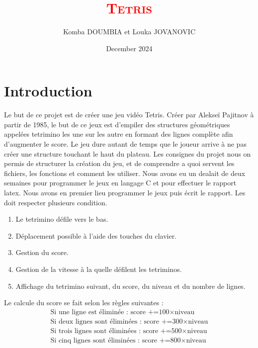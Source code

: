 \documentclass[a4paper,10p]{report}
\begin{document}
\begin{titlepage}
\author{\Large{Komba DOUMBIA et Louka JOVANOVIC}}
\title{\textcolor{red} {\textsc{\Huge Tetris}}}
\date{December 2024}
\maketitle
\end{titlepage}

\tableofcontents

\chapter{Introduction}
Le but de ce projet est de créer une jeu vidéo Tetris. Créer par Alekseï Pajitnov à partir de 1985, le but de ce jeux est d'empiler des structures géométriques appelées tetrimino les une sur les autre en formant des lignes complète afin d'augmenter le score. Le jeu dure autant de temps que le joueur arrive à ne pas créer une structure touchant le haut du plateau. Les consignes du projet nous on permis de structurer la création du jeu, et de comprendre a quoi servent les fichiers, les fonctions et comment les utiliser. Nous avons eu un dealait de deux semaines pour programmer le jeux en langage C et pour effectuer le rapport latex. Nous avons en premier lieu programmer le jeux puis écrit le rapport. Les doit respecter plusieurs condition.
\begin{enumerate}
    \item Le tetrimino défile vers le bas.
    \item Déplacement possible à l'aide des touches du clavier.
    \item Gestion du score.
    \item Gestion de la vitesse à la quelle défilent les tetriminos.
    \item Affichage du tetrimino suivant, du score, du niveau et du nombre de lignes.
\end{enumerate}
Le calcule du score se fait selon les règles suivantes :
\begin{equation*}
\begin{split}
    \text{Si une ligne est éliminée : score +=100}\times\text{niveau}
    \\
    \text{Si deux lignes sont éliminées : score +=300}\times\text{niveau}
    \\
    \text{Si trois lignes sont éliminées : score +=500}\times\text{niveau}
    \\
    \text{Si cinq lignes sont éliminées : score +=800}\times\text{niveau}
\end{split}
\end{equation*}
\end{document}
